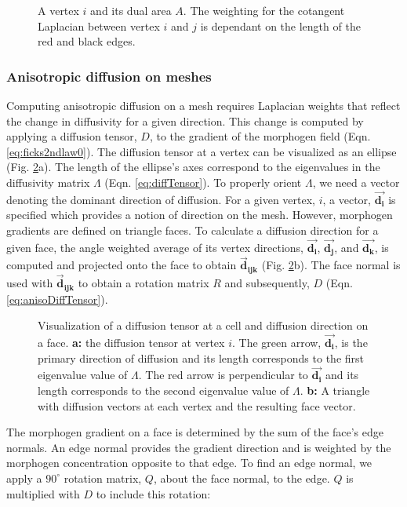 \begin{figure}[H]
	\centering
	\caption[A vertex $i$ and its dual area $A$]{A vertex $i$ and its dual area $A$. The weighting for the cotangent Laplacian between vertex $i$ and $j$ is dependant on the length of the red and black edges.}
	\label{fig:dualMesh}
\end{figure}

\subsubsection*{Anisotropic diffusion on meshes}
Computing anisotropic diffusion on a mesh requires Laplacian weights that reflect the change in diffusivity for a given direction. This change is computed by applying a diffusion tensor, $D$, to the gradient of the morphogen field (Eqn. \ref{eq:ficks2ndlaw0}). The diffusion tensor at a vertex can be visualized as an ellipse (Fig. \ref{fig:anisoMesh}a). The length of the ellipse's axes correspond to the eigenvalues in the diffusivity matrix $\Lambda$ (Eqn. \ref{eq:diffTensor}). To properly orient $\Lambda$, we need a vector denoting the dominant direction of diffusion. For a given vertex, $i$, a vector, $\boldsymbol{\vec{d_i}}$ is specified which provides a notion of direction on the mesh. However, morphogen gradients are defined on triangle faces. To calculate a diffusion direction for a given face, the angle weighted average of its vertex directions, $\boldsymbol{\vec{d_i}}$, $\boldsymbol{\vec{d_j}}$, and $\boldsymbol{\vec{d_k}}$, is computed and projected onto the face to obtain $\boldsymbol{\vec{d}_{ijk}}$ (Fig. \ref{fig:anisoMesh}b). The face normal is used with $\boldsymbol{\vec{d}_{ijk}}$ to obtain a rotation matrix $R$ and subsequently, $D$ (Eqn. \ref{eq:anisoDiffTensor}). 
\begin{figure}[H]
	\centering
	\caption[Visualization of a diffusion tensor at a cell and diffusion direction on a face]{Visualization of a diffusion tensor at a cell and diffusion direction on a face. \textbf{a:} the diffusion tensor at vertex $i$. The green arrow, $\boldsymbol{\vec{d_i}}$, is the primary direction of diffusion and its length corresponds to the first eigenvalue value of $\Lambda$. The red arrow is perpendicular to $\boldsymbol{\vec{d_i}}$ and its length corresponds to the second eigenvalue value of $\Lambda$. \textbf{b:} A triangle with diffusion vectors at each vertex and the resulting face vector.}
	\label{fig:anisoMesh}
\end{figure}
The morphogen gradient on a face is determined by the sum of the face's edge normals. An edge normal provides the gradient direction and is weighted by the morphogen concentration opposite to that edge. To find an edge normal, we apply a $90^\circ$ rotation matrix, $Q$, about the face normal, to the edge. $Q$ is multiplied with $D$ to include this rotation:
